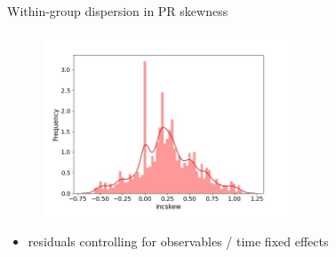 \documentclass{beamer}
\begin{document}
\begin{frame}{Within-group dispersion in PR skewness}
	\label{appendix:incskew}
	\begin{figure}
		\centering
		\includegraphics[width=0.65\textwidth]{figures/hist_incskew.jpg}
	\end{figure}
	\begin{itemize}
		\item  residuals controlling for observables / time fixed effects
			\quad \hyperlink{rincstd_hist}{}    
	\end{itemize}
\end{frame}
\end{document}
